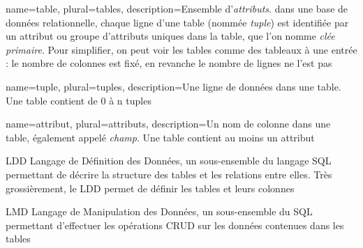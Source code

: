         {name={table},
        plural={tables},
        description={Ensemble d'\textit{attributs}.
        dans une base de données relationnelle, chaque ligne d'une table (nommée \textit{tuple}) est identifiée
        par un attribut ou groupe d'attributs
        uniques dans la table, que l'on nomme \textit{clée primaire}.
        Pour simplifier, on peut voir les tables comme des tableaux à une entrée : le nombre de colonnes est fixé, en revanche le nombre de lignes ne l'est pas}}

        {name={tuple},
        plural={tuples},
        description={Une ligne de données dans une table. Une table contient de 0 à n tuples}}

        {name={attribut},
        plural={attributs},
        description={Un nom de colonne dans une table, également appelé \textit{champ}.
        Une table contient au moins un attribut}}
        



        {LDD}
        {Langage de Définition des Données, un sous-ensemble du langage SQL permettant de décrire la structure des tables et les relations entre elles. Très grossièrement, le LDD permet de définir les tables et leurs colonnes}

        {LMD}
        {Langage de Manipulation des Données, un sous-ensemble du SQL permettant d'effectuer les opérations CRUD sur les données contenues dans les tables}

